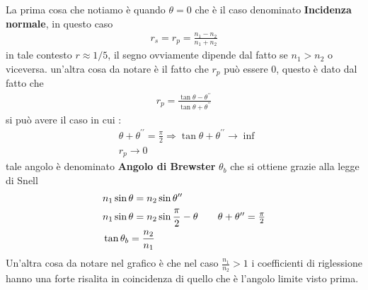 La prima cosa che notiamo è quando $\theta=0$ che è il caso denominato \textbf{Incidenza normale},
in questo caso 
\begin{align*}
    r_{s} = r_{p} = \frac{n_{1}-n_{2}}{n_{1}+n_{2}}
\end{align*}
in tale contesto $r \approx 1/5$, il segno ovviamente dipende dal fatto se $n_{1}>n_{2}$ 
o viceversa.
\newpage
un'altra cosa da notare è il fatto che $r_{p}$ può essere 0, questo è dato dal fatto che 
\begin{align*}
    r_{p} = \frac{\tan{\theta-\theta^{\prime\prime}}}{\tan{\theta+\theta^{\prime\prime}}}
\end{align*}
si può avere il caso in cui :
\begin{align*}
    &\theta+\theta^{\prime\prime} = \frac{\pi}{2} \Longrightarrow \tan{\theta+\theta^{\prime\prime}}\rightarrow\inf\\
    &r_{p}\rightarrow0
\end{align*}
tale angolo è denominato \textbf{Angolo di Brewster} $\theta_{b}$ che si ottiene grazie alla legge di Snell
\begin{align*}
    &n_{1}\sin{\theta} = n_{2}\sin{\theta^{\prime\prime}}\\
    &n_{1}\sin{\theta} = n_{2}\sin{\frac{\pi}{2}-\theta} \tag*{$\theta+\theta^{\prime\prime} = \frac{\pi}{2}$}\\
    &\tan{\theta_{b}} = \frac{n_{2}}{n_{1}}
\end{align*}
Un'altra cosa da notare nel grafico è che nel caso $\frac{n_{1}}{n_{2}}>1$ i coefficienti di riglessione
hanno una forte risalita in coincidenza di quello che è l'angolo limite visto prima.

